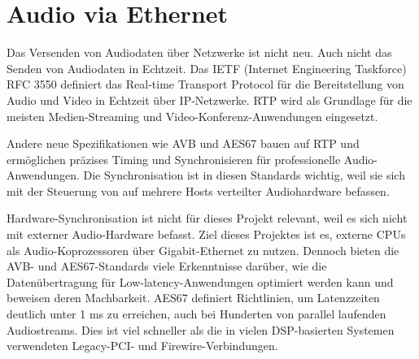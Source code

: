 \section{Audio via Ethernet}

Das Versenden von Audiodaten über Netzwerke ist nicht neu. Auch nicht das Senden von Audiodaten in Echtzeit. Das IETF (Internet Engineering Taskforce) RFC 3550 definiert das Real-time Transport Protocol für die Bereitstellung von Audio und Video in Echtzeit über IP-Netzwerke. RTP wird als Grundlage für die meisten Medien-Streaming und Video-Konferenz-Anwendungen eingesetzt.

Andere neue Spezifikationen wie AVB und AES67 bauen auf RTP und ermöglichen  präzises Timing und Synchronisieren für professionelle Audio-Anwendungen. Die Synchronisation ist in diesen Standards wichtig, weil sie sich mit der Steuerung von auf mehrere Hosts verteilter Audiohardware befassen.

Hardware-Synchronisation ist nicht für dieses Projekt relevant, weil es sich nicht mit externer Audio-Hardware befasst.  Ziel dieses Projektes ist es, externe CPUs als Audio-Koprozessoren über Gigabit-Ethernet zu nutzen.  Dennoch bieten die AVB- und AES67-Standards viele Erkenntnisse darüber, wie die Datenübertragung für Low-latency-Anwendungen optimiert werden kann und  beweisen deren Machbarkeit.  AES67 definiert Richtlinien, um Latenzzeiten deutlich unter 1 ms zu erreichen, auch bei Hunderten von parallel laufenden Audiostreams. Dies ist viel schneller als die in vielen DSP-basierten Systemen verwendeten Legacy-PCI- und Firewire-Verbindungen.
